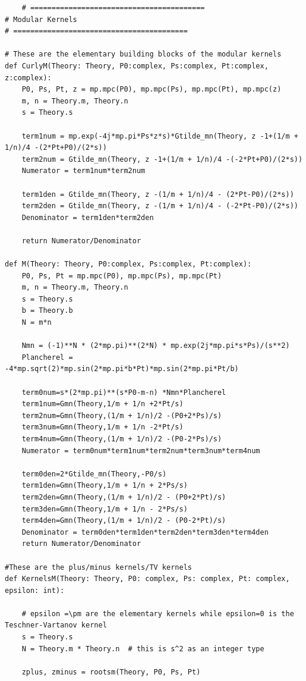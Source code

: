 \documentclass[11pt]{article}
\begin{document}
\begin{lstlisting}
    # =========================================
# Modular Kernels
# =========================================

# These are the elementary building blocks of the modular kernels
def CurlyM(Theory: Theory, P0:complex, Ps:complex, Pt:complex, z:complex):
    P0, Ps, Pt, z = mp.mpc(P0), mp.mpc(Ps), mp.mpc(Pt), mp.mpc(z)
    m, n = Theory.m, Theory.n
    s = Theory.s

    term1num = mp.exp(-4j*mp.pi*Ps*z*s)*Gtilde_mn(Theory, z -1+(1/m + 1/n)/4 -(2*Pt+P0)/(2*s))
    term2num = Gtilde_mn(Theory, z -1+(1/m + 1/n)/4 -(-2*Pt+P0)/(2*s))
    Numerator = term1num*term2num

    term1den = Gtilde_mn(Theory, z -(1/m + 1/n)/4 - (2*Pt-P0)/(2*s))
    term2den = Gtilde_mn(Theory, z -(1/m + 1/n)/4 - (-2*Pt-P0)/(2*s))
    Denominator = term1den*term2den

    return Numerator/Denominator
    
def M(Theory: Theory, P0:complex, Ps:complex, Pt:complex):
    P0, Ps, Pt = mp.mpc(P0), mp.mpc(Ps), mp.mpc(Pt)
    m, n = Theory.m, Theory.n
    s = Theory.s
    b = Theory.b
    N = m*n

    Nmn = (-1)**N * (2*mp.pi)**(2*N) * mp.exp(2j*mp.pi*s*Ps)/(s**2)
    Plancherel = -4*mp.sqrt(2)*mp.sin(2*mp.pi*b*Pt)*mp.sin(2*mp.pi*Pt/b)

    term0num=s*(2*mp.pi)**(s*P0-m-n) *Nmn*Plancherel
    term1num=Gmn(Theory,1/m + 1/n +2*Pt/s)
    term2num=Gmn(Theory,(1/m + 1/n)/2 -(P0+2*Ps)/s)
    term3num=Gmn(Theory,1/m + 1/n -2*Pt/s)
    term4num=Gmn(Theory,(1/m + 1/n)/2 -(P0-2*Ps)/s)
    Numerator = term0num*term1num*term2num*term3num*term4num

    term0den=2*Gtilde_mn(Theory,-P0/s)
    term1den=Gmn(Theory,1/m + 1/n + 2*Ps/s)
    term2den=Gmn(Theory,(1/m + 1/n)/2 - (P0+2*Pt)/s)
    term3den=Gmn(Theory,1/m + 1/n - 2*Ps/s)
    term4den=Gmn(Theory,(1/m + 1/n)/2 - (P0-2*Pt)/s)
    Denominator = term0den*term1den*term2den*term3den*term4den
    return Numerator/Denominator

#These are the plus/minus kernels/TV kernels
def KernelsM(Theory: Theory, P0: complex, Ps: complex, Pt: complex, epsilon: int):

    # epsilon =\pm are the elementary kernels while epsilon=0 is the Teschner-Vartanov kernel
    s = Theory.s
    N = Theory.m * Theory.n  # this is s^2 as an integer type

    zplus, zminus = rootsm(Theory, P0, Ps, Pt)


\end{lstlisting}
\end{document}
